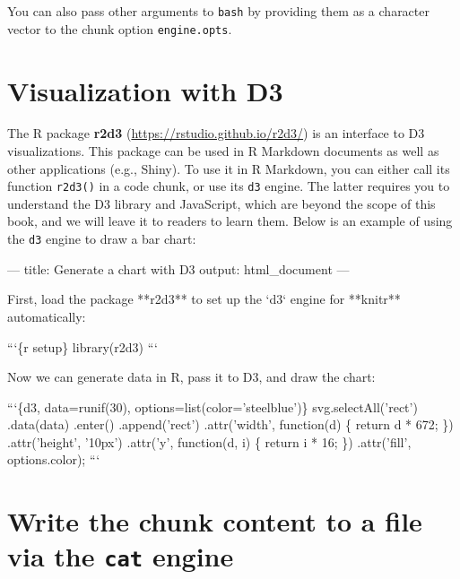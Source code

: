 \documentclass[
  11pt,
]{krantz}
\newenvironment{Shaded}{\begin{snugshade}}{\end{snugshade}}
\newcommand{\BaseNTok}[1]{\textcolor[rgb]{0.06,0.06,0.06}{#1}}
\newcommand{\NormalTok}[1]{#1}
\begin{document}
You can also pass other arguments to \texttt{bash} by providing them as a character vector to the chunk option \texttt{engine.opts}.

\hypertarget{d3}{%
\section{Visualization with D3}\label{d3}}

The R package \textbf{r2d3} (\url{https://rstudio.github.io/r2d3/}) is an interface to D3 visualizations. This package can be used in R Markdown documents as well as other applications (e.g., Shiny). To use it in R Markdown, you can either call its function \texttt{r2d3()} in a code chunk, or use its \texttt{d3} engine. The latter requires you to understand the D3 library and JavaScript, which are beyond the scope of this book, and we will leave it to readers to learn them. Below is an example of using the \texttt{d3} engine to draw a bar chart:

\begin{Shaded}
\begin{Highlighting}[]
\NormalTok{---}
\NormalTok{title: Generate a chart with D3}
\NormalTok{output: html_document}
\NormalTok{---}

\NormalTok{First, load the package **r2d3** to set up the }\BaseNTok{`d3`}\NormalTok{ engine}
\NormalTok{for **knitr** automatically:}

\BaseNTok{```\{r setup\}}
\BaseNTok{library(r2d3)}
\BaseNTok{```}

\NormalTok{Now we can generate data in R, pass it to D3, and draw}
\NormalTok{the chart:}

\BaseNTok{```\{d3, data=runif(30), options=list(color='steelblue')\}}
\BaseNTok{svg.selectAll('rect')}
\BaseNTok{  .data(data)}
\BaseNTok{  .enter()}
\BaseNTok{    .append('rect')}
\BaseNTok{      .attr('width', function(d) \{ return d * 672; \})}
\BaseNTok{      .attr('height', '10px')}
\BaseNTok{      .attr('y', function(d, i) \{ return i * 16; \})}
\BaseNTok{      .attr('fill', options.color);}
\BaseNTok{```}
\end{Highlighting}
\end{Shaded}

\hypertarget{eng-cat}{%
\section{\texorpdfstring{Write the chunk content to a file via the \texttt{cat} engine}{Write the chunk content to a file via the cat engine}}\label{eng-cat}}
\end{document}
